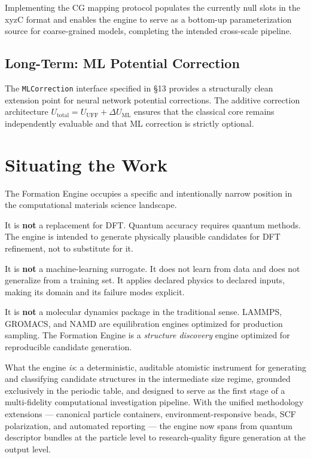 \documentclass[11pt]{article}
\begin{document}
Implementing the CG mapping protocol populates the currently
null slots in the xyzC format and enables the engine to serve
as a bottom-up parameterization source for coarse-grained models,
completing the intended cross-scale pipeline.

\subsection{Long-Term: ML Potential Correction}

The \texttt{MLCorrection} interface specified in \S13 provides a
structurally clean extension point for neural network potential
corrections.  The additive correction architecture
$U_{\text{total}} = U_{\text{UFF}} + \Delta U_{\text{ML}}$
ensures that the classical core remains independently evaluable
and that ML correction is strictly optional.

\section{Situating the Work}

The Formation Engine occupies a specific and intentionally
narrow position in the computational materials science landscape.

It is \textbf{not} a replacement for DFT.  Quantum accuracy requires
quantum methods.  The engine is intended to generate physically
plausible candidates for DFT refinement, not to substitute for it.

It is \textbf{not} a machine-learning surrogate.  It does not learn
from data and does not generalize from a training set.  It applies
declared physics to declared inputs, making its domain and its
failure modes explicit.

It is \textbf{not} a molecular dynamics package in the traditional
sense.  LAMMPS, GROMACS, and NAMD are equilibration engines
optimized for production sampling.  The Formation Engine is a
\textit{structure discovery} engine optimized for reproducible
candidate generation.

What the engine \textit{is}: a deterministic, auditable atomistic
instrument for generating and classifying candidate structures in
the intermediate size regime, grounded exclusively in the periodic
table, and designed to serve as the first stage of a multi-fidelity
computational investigation pipeline.  With the unified methodology
extensions --- canonical particle containers, environment-responsive
beads, SCF polarization, and automated reporting --- the engine now
spans from quantum descriptor bundles at the particle level to
research-quality figure generation at the output level.
\end{document}
